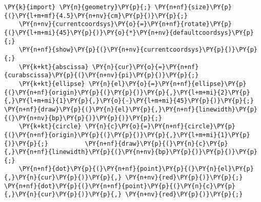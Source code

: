 \begin{Verbatim}[commandchars=\\\{\}]
    \PY{k}{import} \PY{n}{geometry}\PY{p}{;} \PY{n+nf}{size}\PY{p}{(}\PY{l+m+mf}{4.5}\PY{n+nv}{cm}\PY{p}{)}\PY{p}{;}
    \PY{n+nv}{currentcoordsys}\PY{o}{=}\PY{n+nf}{rotate}\PY{p}{(}\PY{l+m+mi}{45}\PY{p}{)}\PY{o}{*}\PY{n+nv}{defaultcoordsys}\PY{p}{;}
    \PY{n+nf}{show}\PY{p}{(}\PY{n+nv}{currentcoordsys}\PY{p}{)}\PY{p}{;}
    \PY{k+kt}{abscissa} \PY{n}{cur}\PY{o}{=}\PY{n+nf}{curabscissa}\PY{p}{(}\PY{n+nv}{pi}\PY{p}{)}\PY{p}{;}
    \PY{k+kt}{ellipse} \PY{n}{el}\PY{o}{=}\PY{n+nf}{ellipse}\PY{p}{(}\PY{n+nf}{origin}\PY{p}{(}\PY{p}{)}\PY{p}{,}\PY{l+m+mi}{2}\PY{p}{,}\PY{l+m+mi}{1}\PY{p}{,}\PY{o}{-}\PY{l+m+mi}{45}\PY{p}{)}\PY{p}{;} \PY{n+nf}{draw}\PY{p}{(}\PY{n}{el}\PY{p}{,}\PY{n+nf}{linewidth}\PY{p}{(}\PY{n+nv}{bp}\PY{p}{)}\PY{p}{)}\PY{p}{;}
    \PY{k+kt}{circle} \PY{n}{c}\PY{o}{=}\PY{n+nf}{circle}\PY{p}{(}\PY{n+nf}{origin}\PY{p}{(}\PY{p}{)}\PY{p}{,}\PY{l+m+mi}{1}\PY{p}{)}\PY{p}{;}          \PY{n+nf}{draw}\PY{p}{(}\PY{n}{c}\PY{p}{,}\PY{n+nf}{linewidth}\PY{p}{(}\PY{n+nv}{bp}\PY{p}{)}\PY{p}{)}\PY{p}{;}
    \PY{n+nf}{dot}\PY{p}{(}\PY{n+nf}{point}\PY{p}{(}\PY{n}{el}\PY{p}{,}\PY{n}{cur}\PY{p}{)}\PY{p}{,} \PY{n+nv}{red}\PY{p}{)}\PY{p}{;} \PY{n+nf}{dot}\PY{p}{(}\PY{n+nf}{point}\PY{p}{(}\PY{n}{c}\PY{p}{,}\PY{n}{cur}\PY{p}{)}\PY{p}{,} \PY{n+nv}{red}\PY{p}{)}\PY{p}{;}
\end{Verbatim}
